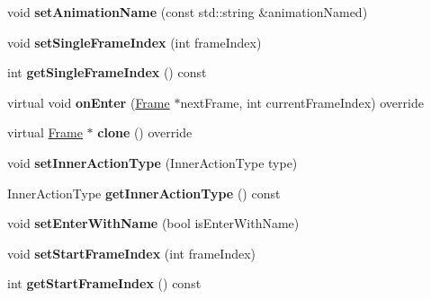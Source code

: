 \begin{DoxyCompactItemize}
\mbox{\label{classInnerActionFrame_a9add2a73cdff02750cd9e4795a8c8b61}} 
void {\bfseries set\+Animation\+Name} (const std\+::string \&animation\+Named)
\item 
\mbox{\label{classInnerActionFrame_ab280aa0dc6e0b7dd5e301b7cebdbf86c}} 
void {\bfseries set\+Single\+Frame\+Index} (int frame\+Index)
\item 
\mbox{\label{classInnerActionFrame_adf7d5882fc2160ddeb1766e536105b60}} 
int {\bfseries get\+Single\+Frame\+Index} () const
\item 
\mbox{\label{classInnerActionFrame_a3e6e0c0c43286e18bc8c5463e937001a}} 
virtual void {\bfseries on\+Enter} (\hyperlink{classFrame}{Frame} $\ast$next\+Frame, int current\+Frame\+Index) override
\item 
\mbox{\label{classInnerActionFrame_a50f3fc0a7a1e85883f76aec67f96ae3f}} 
virtual \hyperlink{classFrame}{Frame} $\ast$ {\bfseries clone} () override
\item 
\mbox{\label{classInnerActionFrame_a741d2e51b801534712ed611ef74baa59}} 
void {\bfseries set\+Inner\+Action\+Type} (Inner\+Action\+Type type)
\item 
\mbox{\label{classInnerActionFrame_a58b5dc2b221ebd5609373143eca75200}} 
Inner\+Action\+Type {\bfseries get\+Inner\+Action\+Type} () const
\item 
\mbox{\label{classInnerActionFrame_a1cf65b1be5d458decfc6fd4ab808bef7}} 
void {\bfseries set\+Enter\+With\+Name} (bool is\+Enter\+With\+Name)
\item 
\mbox{\label{classInnerActionFrame_a3deb36c15486ef7b5578c0c4a0622b74}} 
void {\bfseries set\+Start\+Frame\+Index} (int frame\+Index)
\item 
\mbox{\label{classInnerActionFrame_a3a0afd126fc27a174f0782a1799e3311}} 
int {\bfseries get\+Start\+Frame\+Index} () const
\item 
\mbox{\label{classInnerActionFrame_a56daba40ea933f77d001f44b0737f801}} 

\end{DoxyCompactItemize}
